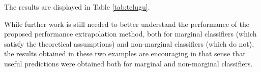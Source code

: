 \documentclass[12pt]{article}
\begin{document}
The results are displayed in Table \ref{tab:telugu}.  

While further work is still needed to better understand the
performance of the proposed performance extrapolation method, both for
marginal classifiers (which satisfy the theoretical assumptions) and
non-marginal classifiers (which do not), the results obtained in these
two examples are encouraging in that sense that useful predictions
were obtained both for marginal and non-marginal classifiers.


\printbibliography[heading=bibintoc]
\end{document}
